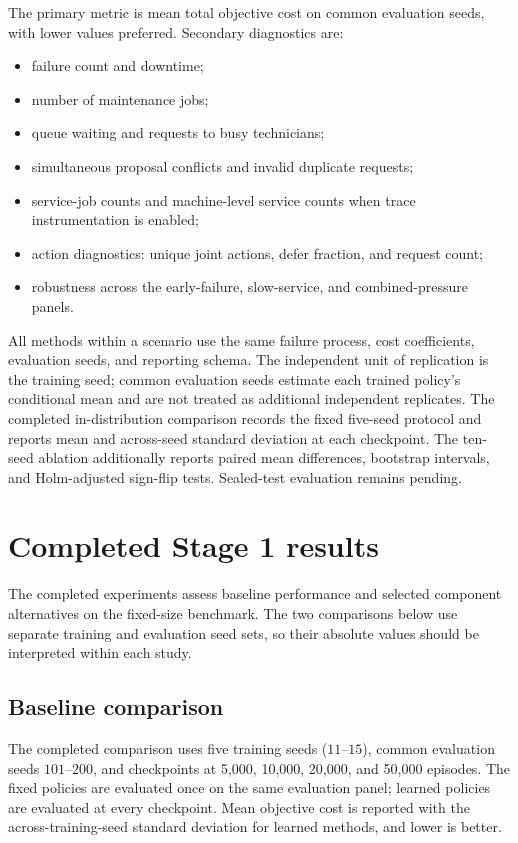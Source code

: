\documentclass[11pt]{article}
\begin{document}
The primary metric is mean total objective cost on common evaluation seeds, with lower values preferred. Secondary diagnostics are:

\begin{itemize}[leftmargin=*]
    \item failure count and downtime;
    \item number of maintenance jobs;
    \item queue waiting and requests to busy technicians;
    \item simultaneous proposal conflicts and invalid duplicate requests;
    \item service-job counts and machine-level service counts when trace instrumentation is enabled;
    \item action diagnostics: unique joint actions, defer fraction, and request count;
    \item robustness across the early-failure, slow-service, and combined-pressure panels.
\end{itemize}

All methods within a scenario use the same failure process, cost coefficients, evaluation seeds, and reporting schema. The independent unit of replication is the training seed; common evaluation seeds estimate each trained policy's conditional mean and are not treated as additional independent replicates. The completed in-distribution comparison records the fixed five-seed protocol and reports mean and across-seed standard deviation at each checkpoint. The ten-seed ablation additionally reports paired mean differences, bootstrap intervals, and Holm-adjusted sign-flip tests. Sealed-test evaluation remains pending.

\section{Completed Stage 1 results}

The completed experiments assess baseline performance and selected component alternatives on the fixed-size benchmark. The two comparisons below use separate training and evaluation seed sets, so their absolute values should be interpreted within each study.

\subsection{Baseline comparison}

The completed comparison uses five training seeds ($11$--$15$), common
evaluation seeds $101$--$200$, and checkpoints at 5,000, 10,000, 20,000, and
50,000 episodes. The fixed policies are evaluated once on the same evaluation
panel; learned policies are evaluated at every checkpoint. Mean objective cost
is reported with the across-training-seed standard deviation for learned
methods, and lower is better.
\end{document}
